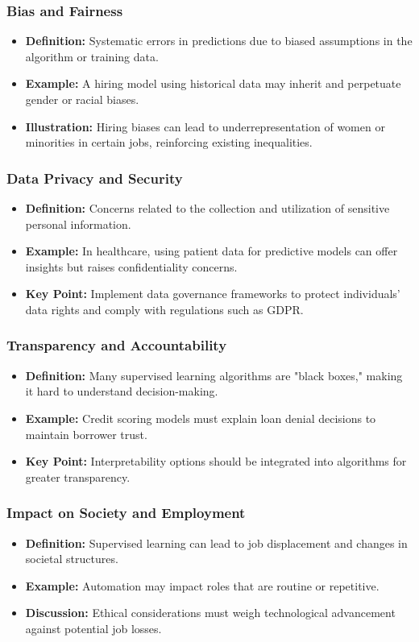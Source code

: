 \documentclass[aspectratio=169]{beamer}
\begin{document}
\begin{frame}[fragile]
    \frametitle{Bias and Fairness}
    \begin{itemize}
        \item \textbf{Definition:} Systematic errors in predictions due to biased assumptions in the algorithm or training data.
        \item \textbf{Example:} A hiring model using historical data may inherit and perpetuate gender or racial biases.
        \item \textbf{Illustration:} Hiring biases can lead to underrepresentation of women or minorities in certain jobs, reinforcing existing inequalities.
    \end{itemize}
\end{frame}

\begin{frame}[fragile]
    \frametitle{Data Privacy and Security}
    \begin{itemize}
        \item \textbf{Definition:} Concerns related to the collection and utilization of sensitive personal information.
        \item \textbf{Example:} In healthcare, using patient data for predictive models can offer insights but raises confidentiality concerns.
        \item \textbf{Key Point:} Implement data governance frameworks to protect individuals' data rights and comply with regulations such as GDPR.
    \end{itemize}
\end{frame}

\begin{frame}[fragile]
    \frametitle{Transparency and Accountability}
    \begin{itemize}
        \item \textbf{Definition:} Many supervised learning algorithms are "black boxes," making it hard to understand decision-making.
        \item \textbf{Example:} Credit scoring models must explain loan denial decisions to maintain borrower trust.
        \item \textbf{Key Point:} Interpretability options should be integrated into algorithms for greater transparency.
    \end{itemize}
\end{frame}

\begin{frame}[fragile]
    \frametitle{Impact on Society and Employment}
    \begin{itemize}
        \item \textbf{Definition:} Supervised learning can lead to job displacement and changes in societal structures.
        \item \textbf{Example:} Automation may impact roles that are routine or repetitive.
        \item \textbf{Discussion:} Ethical considerations must weigh technological advancement against potential job losses.
    \end{itemize}
\end{frame}
\end{document}
